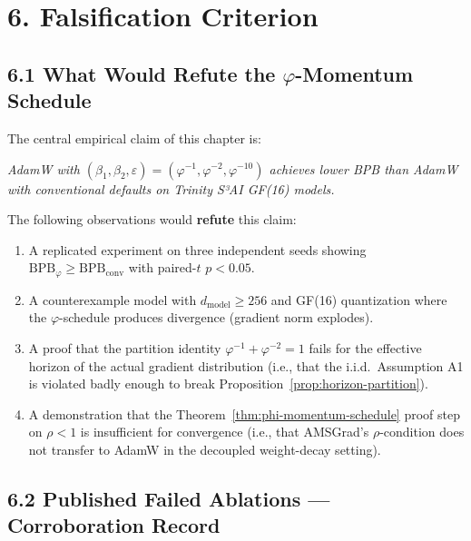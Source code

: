 \section{6. Falsification Criterion}
\label{sec:28-falsification}

\subsection{6.1 What Would Refute the \(\varphi\)-Momentum Schedule}

The central empirical claim of this chapter is:

\begin{center}
  \textit{AdamW with \((\beta_1, \beta_2, \varepsilon) = (\varphi^{-1}, \varphi^{-2}, \varphi^{-10})\)
  achieves lower BPB than AdamW with conventional defaults on
  Trinity S³AI GF(16) models.}
\end{center}

The following observations would \textbf{refute} this claim:

\begin{enumerate}
  \item A replicated experiment on three independent seeds showing
        \(\mathrm{BPB}_\varphi \geq \mathrm{BPB}_{\mathrm{conv}}\)
        with paired-$t$ $p < 0.05$.
  \item A counterexample model with \(d_{\mathrm{model}} \geq 256\) and
        GF(16) quantization where the \(\varphi\)-schedule produces
        divergence (gradient norm explodes).
  \item A proof that the partition identity
        \(\varphi^{-1} + \varphi^{-2} = 1\) fails for the effective
        horizon of the actual gradient distribution (i.e., that the
        i.i.d.\ Assumption A1 is violated badly enough to break
        Proposition~\ref{prop:horizon-partition}).
  \item A demonstration that the Theorem~\ref{thm:phi-momentum-schedule}
        proof step on $\rho < 1$ is insufficient for convergence
        (i.e., that AMSGrad's $\rho$-condition does not transfer to
        AdamW in the decoupled weight-decay setting).
\end{enumerate}

\subsection{6.2 Published Failed Ablations — Corroboration Record}

